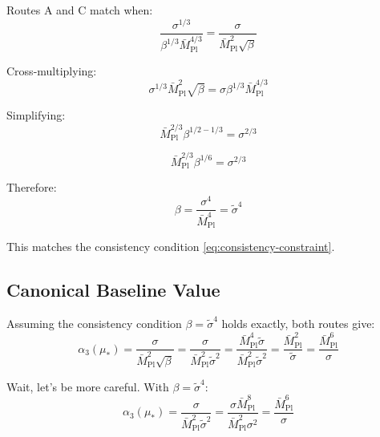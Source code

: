 \documentclass[11pt,a4paper]{article}
\theoremstyle{definition}
\begin{document}
Routes A and C match when:
\begin{equation}
\label{eq:matching-cond}
\frac{\sigma^{1/3}}{\beta^{1/3} \bar{M}_{\text{Pl}}^{4/3}}
  = \frac{\sigma}{\bar{M}_{\text{Pl}}^2 \sqrt{\beta}}
\end{equation}

Cross-multiplying:
\begin{equation}
\label{eq:matching-cross}
\sigma^{1/3} \bar{M}_{\text{Pl}}^2 \sqrt{\beta} = \sigma \beta^{1/3} \bar{M}_{\text{Pl}}^{4/3}
\end{equation}

Simplifying:
\begin{equation}
\label{eq:matching-simp}
\bar{M}_{\text{Pl}}^{2/3} \beta^{1/2 - 1/3} = \sigma^{2/3}
\end{equation}

\begin{equation}
\label{eq:matching-final}
\bar{M}_{\text{Pl}}^{2/3} \beta^{1/6} = \sigma^{2/3}
\end{equation}

Therefore:
\begin{equation}
\label{eq:beta-sigma-relation}
\beta = \frac{\sigma^4}{\bar{M}_{\text{Pl}}^4} = \tilde{\sigma}^4
\end{equation}

This matches the consistency condition \eqref{eq:consistency-constraint}.

\subsection{Canonical Baseline Value}
\label{subsec:canonical-baseline}

Assuming the consistency condition $\beta = \tilde{\sigma}^4$ holds exactly,
both routes give:
\begin{equation}
\label{eq:alpha3-canonical}
\alpha_3(\mu_*) = \frac{\sigma}{\bar{M}_{\text{Pl}}^2 \sqrt{\beta}}
  = \frac{\sigma}{\bar{M}_{\text{Pl}}^2 \tilde{\sigma}^2}
  = \frac{\bar{M}_{\text{Pl}}^4 \tilde{\sigma}}{\bar{M}_{\text{Pl}}^2 \tilde{\sigma}^2}
  = \frac{\bar{M}_{\text{Pl}}^2}{\tilde{\sigma}}
  = \frac{\bar{M}_{\text{Pl}}^6}{\sigma}
\end{equation}

Wait, let's be more careful. With $\beta = \tilde{\sigma}^4$:
\begin{equation}
\label{eq:alpha3-canonical-v2}
\alpha_3(\mu_*) = \frac{\sigma}{\bar{M}_{\text{Pl}}^2 \tilde{\sigma}^2}
  = \frac{\sigma \bar{M}_{\text{Pl}}^8}{\bar{M}_{\text{Pl}}^2 \sigma^2}
  = \frac{\bar{M}_{\text{Pl}}^6}{\sigma}
\end{equation}
\end{document}
